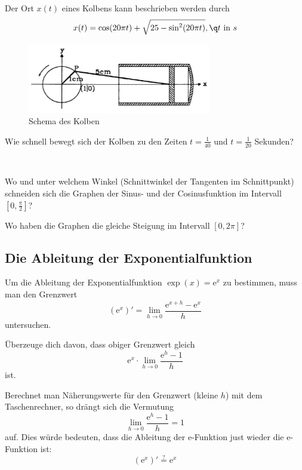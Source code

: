 \documentclass[%
11pt,%
twoside,%
titlepage,%
german,%
headsepline%
]{scrartcl}
\begin{document}
\begin{ueb}[Kolben]
Der
Ort $x(t)$ eines Kolbens kann beschrieben werden durch
$$x(t)=\cos(20\pi t)+ \sqrt{25-\sin^2(20\pi t)},\q t\text{ in }s$$
\begin{figure}[h!]
\begin{center}
\includegraphics[width=8cm]{pictures/kolben}
\end{center}
\caption{Schema des Kolben}
\end{figure}

Wie schnell bewegt sich der Kolben zu den Zeiten $t=\frac{1}{40}$ und $t=\frac{1}{20}$ Sekunden?
\end{ueb}

\begin{ueb}
\ \\[-4ex]
\begin{enumeratea}
\item Wo und unter welchem Winkel (Schnittwinkel der Tangenten im Schnittpunkt) schneiden sich die Graphen der Sinus- und der Cosinusfunktion im Intervall $[0,\frac{\pi}{2}]$?
\item Wo haben die Graphen die gleiche Steigung im Intervall $[0,2\pi]$?
\end{enumeratea}
\end{ueb}

\subsection{Die Ableitung der Exponentialfunktion}

Um die Ableitung der Exponentialfunktion $\exp(x)=\mathrm{e}^x$ zu bestimmen, muss man den Grenzwert
$$\left(\mathrm{e}^x\right)'=\lim_{h\to0}\frac{\mathrm{e}^{x+h}-\mathrm{e}^x}{h}$$
untersuchen.
\begin{ueb}
\"Uberzeuge dich davon, dass obiger Grenzwert gleich
$$\mathrm{e}^x\cdot\lim_{h\to0}\frac{\mathrm{e}^h-1}{h}$$
ist.
\end{ueb}
Berechnet man N\"aherungswerte f\"ur den Grenzwert (kleine $h$) mit dem Taschenrechner, so dr\"angt sich die Vermutung
$$\lim_{h\to0}\frac{\mathrm{e}^h-1}{h}=1$$
auf. Dies w\"urde bedeuten, dass die Ableitung der $\mathrm{e}$-Funktion just wieder die $\mathrm{e}$-Funktion ist:
$$\left(\mathrm{e}^x\right)'\stackrel{?}{=}\mathrm{e}^x$$
\end{document}

